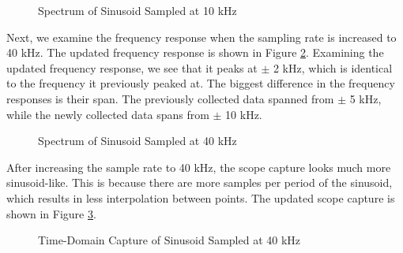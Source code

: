 \documentclass{article}
\begin{document}
\begin{figure}[H]
	\centerline{}
	\caption{Spectrum of Sinusoid Sampled at 10 kHz}
	\label{fig::sampling_rates_freq_domain_10k_samp_rate}
\end{figure}

Next, we examine the frequency response when the sampling rate is increased to 40 kHz. The updated frequency response is shown in Figure \ref{fig::sampling_rates_freq_domain_40k_samp_rate}. Examining the updated frequency response, we see that it peaks at $\pm$ 2 kHz, which is identical to the frequency it previously peaked at. The biggest difference in the frequency responses is their span. The previously collected data spanned from $\pm$ 5 kHz, while the newly collected data spans from $\pm$ 10 kHz.

\begin{figure}[H]
	\centerline{}
	\caption{Spectrum of Sinusoid Sampled at 40 kHz}
	\label{fig::sampling_rates_freq_domain_40k_samp_rate}
\end{figure}

After increasing the sample rate to 40 kHz, the scope capture looks much more sinusoid-like. This is because there are more samples per period of the sinusoid, which results in less interpolation between points. The updated scope capture is shown in Figure \ref{fig::sampling_rates_time_domain_40k_samp_rate}.

\begin{figure}[H]
	\centerline{}
	\caption{Time-Domain Capture of Sinusoid Sampled at 40 kHz}
	\label{fig::sampling_rates_time_domain_40k_samp_rate}
\end{figure}
\end{document}
